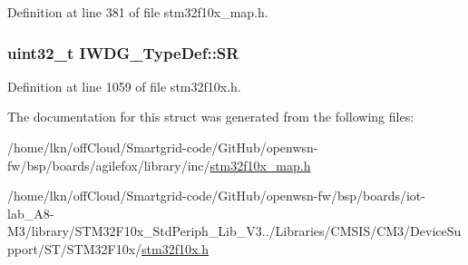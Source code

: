 Definition at line 381 of file stm32f10x\+\_\+map.\+h.

\subsubsection[{\texorpdfstring{SR}{SR}}]{ {\bf uint32\+\_\+t} I\+W\+D\+G\+\_\+\+Type\+Def\+::\+SR}\hypertarget{struct_i_w_d_g___type_def_a9bbfbe921f2acfaf58251849bd0a511c}{}\label{struct_i_w_d_g___type_def_a9bbfbe921f2acfaf58251849bd0a511c}


Definition at line 1059 of file stm32f10x.\+h.



The documentation for this struct was generated from the following files\+:\begin{DoxyCompactItemize}
\item 
/home/lkn/off\+Cloud/\+Smartgrid-\/code/\+Git\+Hub/openwsn-\/fw/bsp/boards/agilefox/library/inc/\hyperlink{agilefox_2library_2inc_2stm32f10x__map_8h}{stm32f10x\+\_\+map.\+h}\item 
/home/lkn/off\+Cloud/\+Smartgrid-\/code/\+Git\+Hub/openwsn-\/fw/bsp/boards/iot-\/lab\+\_\+\+A8-\/\+M3/library/\+S\+T\+M32\+F10x\+\_\+\+Std\+Periph\+\_\+\+Lib\+\_\+\+V3../\+Libraries/\+C\+M\+S\+I\+S/\+C\+M3/\+Device\+Support/\+S\+T/\+S\+T\+M32\+F10x/\hyperlink{iot-lab___a8-_m3_2library_2_s_t_m32_f10x___std_periph___lib___v3_85_80_2_libraries_2_c_m_s_i_s_26497265545392eb5694b064ae15018db}{stm32f10x.\+h}\end{DoxyCompactItemize}
